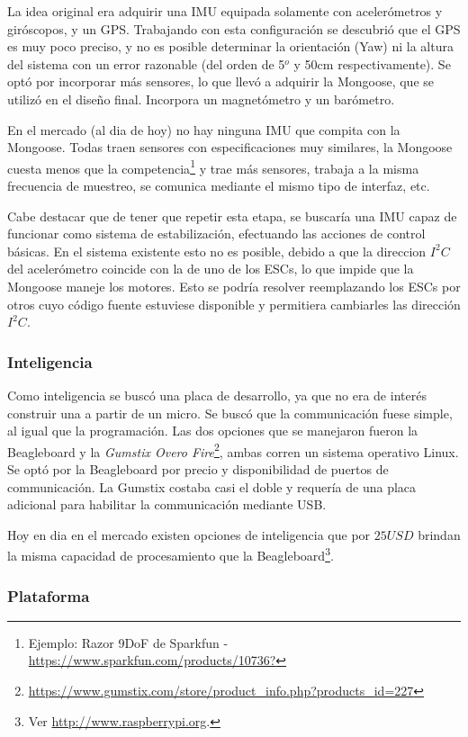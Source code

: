 \documentclass[main]{subfiles}
\begin{document}
La idea original era adquirir una IMU equipada solamente con acelerómetros y giróscopos, y un GPS. Trabajando con esta configuración se descubrió que el GPS es muy poco preciso, y no es posible determinar la orientación (Yaw) ni la altura del sistema con un error razonable (del orden de 5$^o$ y 50cm respectivamente). Se optó por incorporar más sensores, lo que llevó a adquirir la Mongoose, que se utilizó en el diseño final. Incorpora un magnetómetro y un barómetro.

En el mercado (al dia de hoy) no hay ninguna IMU que compita con la Mongoose. Todas traen sensores con especificaciones muy similares, la Mongoose cuesta menos que la competencia\footnote{Ejemplo: Razor 9DoF de Sparkfun - \url{https://www.sparkfun.com/products/10736?}} y trae más sensores, trabaja a la misma frecuencia de muestreo, se comunica mediante el mismo tipo de interfaz, etc.

Cabe destacar que de tener que repetir esta etapa, se buscaría una IMU capaz de funcionar como sistema de estabilización, efectuando las acciones de control básicas. En el sistema existente esto no es posible, debido a que la direccion $I^2C$ del acelerómetro coincide con la de uno de los ESCs, lo que impide que la Mongoose maneje los motores. Esto se podría resolver reemplazando los ESCs por otros cuyo código fuente estuviese disponible y permitiera cambiarles las dirección $I^2C$.

\subsubsection{Inteligencia}
\label{sec:anexo_costos-inteligencia}

Como inteligencia se buscó una placa de desarrollo, ya que no era de interés construir una a partir de un micro. Se buscó que la communicación fuese simple, al igual que la programación. Las dos opciones que se manejaron fueron la Beagleboard y la \textit{Gumstix Overo Fire}\footnote{\url{https://www.gumstix.com/store/product_info.php?products_id=227}}, ambas corren un sistema operativo Linux. Se optó por la Beagleboard por precio y disponibilidad de puertos de communicación. La Gumstix costaba casi el doble y requería de una placa adicional para habilitar la communicación mediante USB.

Hoy en dia en el mercado existen opciones de inteligencia que por $25USD$ brindan la misma capacidad de procesamiento que la Beagleboard\footnote{Ver \url{http://www.raspberrypi.org}.}.

\subsubsection{Plataforma}
\label{sec:anexo_costos-plataforma}
\end{document}
